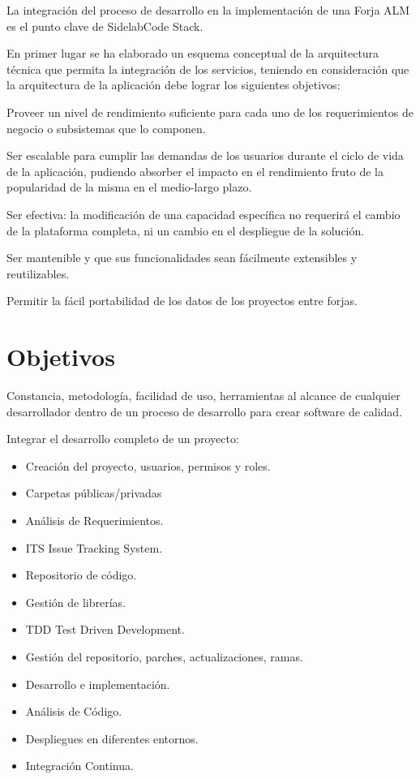 \documentclass[a4paper, 12pt]{book}
\begin{document}
\par La integraci\'on del proceso de desarrollo en la implementaci\'on de una Forja ALM es el punto clave de SidelabCode Stack.

En primer lugar se ha elaborado un esquema conceptual de la arquitectura t\'ecnica que
permita la integraci\'on de los servicios, teniendo en consideraci\'on que la arquitectura de la
aplicaci\'on debe lograr los siguientes objetivos:

Proveer un nivel de rendimiento suficiente para cada uno de los requerimientos de
   negocio o subsistemas que lo componen.

Ser escalable para cumplir las demandas de los usuarios durante el ciclo de vida de la
   aplicaci\'on, pudiendo absorber el impacto en el rendimiento fruto de la popularidad de la
   misma en el medio-largo plazo.

Ser efectiva: la modificaci\'on de una capacidad espec\'ifica no requerir\'a el cambio de la
      plataforma completa, ni un cambio en el despliegue de la soluci\'on.

Ser mantenible y que sus funcionalidades sean f\'acilmente extensibles y reutilizables.

Permitir la f\'acil portabilidad de los datos de los proyectos entre forjas.


\chapter{Objetivos}
\label{chap:objetivos}

\par Constancia, metodolog\'ia, facilidad de uso, herramientas al alcance de cualquier desarrollador dentro de un proceso de desarrollo para crear software de calidad.

\par Integrar el desarrollo completo de un proyecto:

\begin{itemize}
	\item Creaci\'on del proyecto, usuarios, permisos y roles.
	\item Carpetas p\'ublicas/privadas
	\item An\'alisis de Requerimientos.
	\item ITS Issue Tracking System.
	\item Repositorio de c\'odigo.
	\item Gesti\'on de librer\'ias.
	\item TDD Test Driven Development.
	\item Gesti\'on del repositorio, parches, actualizaciones, ramas.
	\item Desarrollo e implementaci\'on.
	\item An\'alisis de C\'odigo.
	\item Despliegues en diferentes entornos.
	\item Integraci\'on Continua.
\end{itemize}
\end{document}
